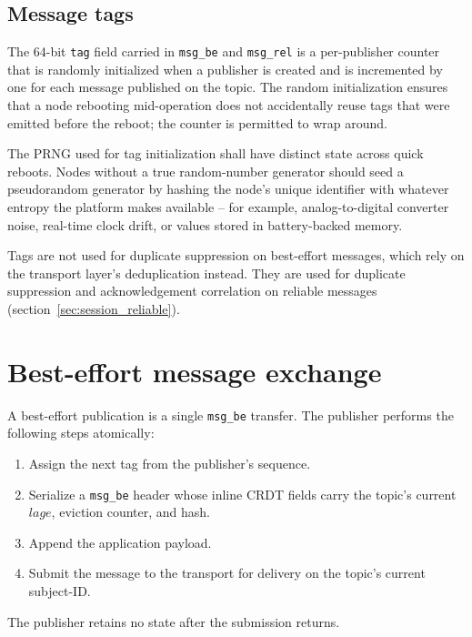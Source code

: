 \subsection{Message tags}\label{sec:session_tags}

The 64-bit \texttt{tag} field carried in \texttt{msg\_be} and \texttt{msg\_rel}
is a per-publisher counter that is randomly initialized when a publisher is
created and is incremented by one for each message published on the topic.
The random initialization ensures that a node rebooting mid-operation does not
accidentally reuse tags that were emitted before the reboot; the counter is
permitted to wrap around.

The PRNG used for tag initialization shall have distinct state across quick
reboots. Nodes without a true random-number generator should seed a pseudorandom
generator by hashing the node's unique identifier with whatever entropy the
platform makes available -- for example, analog-to-digital converter noise,
real-time clock drift, or values stored in battery-backed memory.

Tags are not used for duplicate suppression on best-effort messages, which rely
on the transport layer's deduplication instead. They are used for duplicate
suppression and acknowledgement correlation on reliable messages
(section~\ref{sec:session_reliable}).

\section{Best-effort message exchange}\label{sec:session_best_effort}

A best-effort publication is a single \texttt{msg\_be} transfer. The publisher
performs the following steps atomically:

\begin{enumerate}
    \item Assign the next tag from the publisher's sequence.
    \item Serialize a \texttt{msg\_be} header whose inline CRDT fields carry
    the topic's current $\mathit{lage}$, eviction counter, and hash.
    \item Append the application payload.
    \item Submit the message to the transport for delivery on the topic's
    current subject-ID.
\end{enumerate}

The publisher retains no state after the submission returns.

